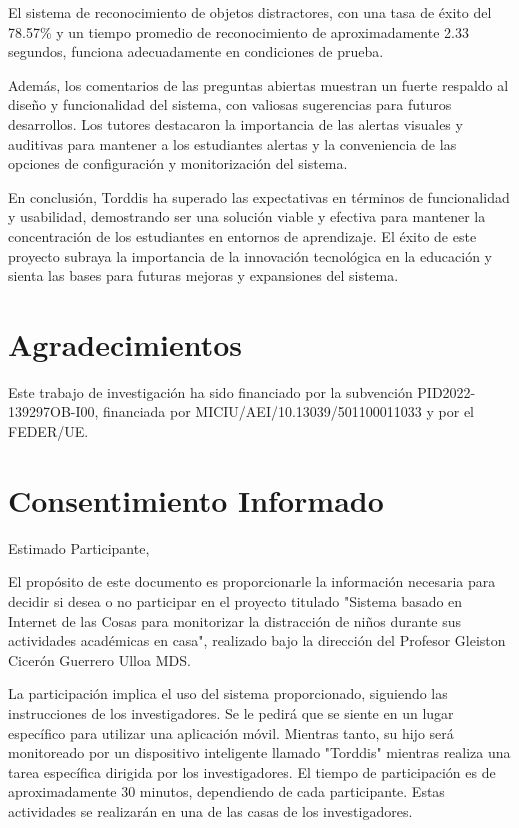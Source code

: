 \documentclass[a4paper,fleqn]{cas-sc}
\begin{document}
		El sistema de reconocimiento de objetos distractores, con una tasa de éxito del 78.57\% y un tiempo promedio de reconocimiento de aproximadamente 2.33 segundos, funciona adecuadamente en condiciones de prueba.
		
		Además, los comentarios de las preguntas abiertas muestran un fuerte respaldo al diseño y funcionalidad del sistema, con valiosas sugerencias para futuros desarrollos. Los tutores destacaron la importancia de las alertas visuales y auditivas para mantener a los estudiantes alertas y la conveniencia de las opciones de configuración y monitorización del sistema.
		
		En conclusión, Torddis ha superado las expectativas en términos de funcionalidad y usabilidad, demostrando ser una solución viable y efectiva para mantener la concentración de los estudiantes en entornos de aprendizaje. El éxito de este proyecto subraya la importancia de la innovación tecnológica en la educación y sienta las bases para futuras mejoras y expansiones del sistema.
	
	\section*{Agradecimientos}
	
	Este trabajo de investigación ha sido financiado por la subvención PID2022-139297OB-I00, financiada por MICIU/AEI/10.13039/501100011033 y por el FEDER/UE.
	
	\printcredits
	
	
	
	
	
	\clearpage
	
	\appendix
	\section{Consentimiento Informado} \label{Appendix:InformedConsent}
	Estimado Participante,
	
	El propósito de este documento es proporcionarle la información necesaria para decidir si desea o no participar en el proyecto titulado "Sistema basado en Internet de las Cosas para monitorizar la distracción de niños durante sus actividades académicas en casa", realizado bajo la dirección del Profesor Gleiston Cicerón Guerrero Ulloa MDS.
	
	La participación implica el uso del sistema proporcionado, siguiendo las instrucciones de los investigadores. Se le pedirá que se siente en un lugar específico para utilizar una aplicación móvil. Mientras tanto, su hijo será monitoreado por un dispositivo inteligente llamado "Torddis" mientras realiza una tarea específica dirigida por los investigadores. El tiempo de participación es de aproximadamente 30 minutos, dependiendo de cada participante. Estas actividades se realizarán en una de las casas de los investigadores.
	
\end{document}
